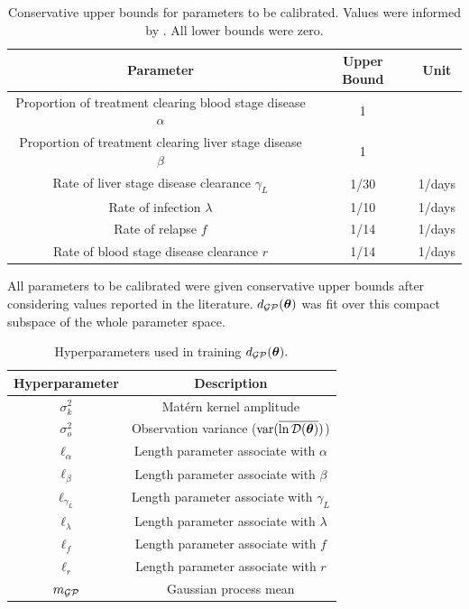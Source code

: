 \begin{table}[htbp]
    \caption{
        Conservative upper bounds for parameters to be calibrated.
        Values were informed by
        \cite{champagne_using_2022, white_variation_2016}. All lower bounds
        were zero.
    }
    \label{tab:param_bounds}
    \centering
    \begin{tabular}{c |c |c}
        Parameter
         & Upper Bound & Unit   \\
        \hline
        Proportion of treatment clearing blood stage disease $\alpha$
         & 1           &        \\
        Proportion of treatment clearing liver stage disease $\beta$
         & 1           &        \\
        Rate of liver stage disease clearance $\gamma_L$
         & 1/30        & 1/days \\
        Rate of infection $\lambda$
         & 1/10        & 1/days \\
        Rate of relapse $f$
         & 1/14        & 1/days \\
        Rate of blood stage disease clearance $r$
         & 1/14        & 1/days
    \end{tabular}
\end{table}

All parameters to be calibrated were given conservative upper bounds after
considering values reported in the literature. $d_{\mathcal{GP}}(\bm{\theta})$ was fit
over this compact subspace of the whole parameter space.

\begin{table}[htbp]
    \caption{
        Hyperparameters used in training $d_{\mathcal{GP}}(\bm{\theta}).$
    }
    \label{tab:hps}
    \centering
    \begin{tabular}{c|c}
        Hyperparameter    & Description                                \\
        \hline
        $\sigma_k^2$      & Mat\'ern kernel amplitude                  \\
        $\sigma_o^2$      & Observation variance ($\operatorname{var}(\overline{\ln\mathcal{D}(\bm{\theta})})$)    \\
        $\ell_\alpha$     & Length parameter associate with $\alpha$   \\
        $\ell_\beta$      & Length parameter associate with $\beta$    \\
        $\ell_{\gamma_L}$ & Length parameter associate with $\gamma_L$ \\
        $\ell_\lambda$    & Length parameter associate with $\lambda$  \\
        $\ell_f$          & Length parameter associate with $f$        \\
        $\ell_r$          & Length parameter associate with $r$        \\
        $m_{\mathcal{GP}}$           & Gaussian process mean
    \end{tabular}
\end{table}

